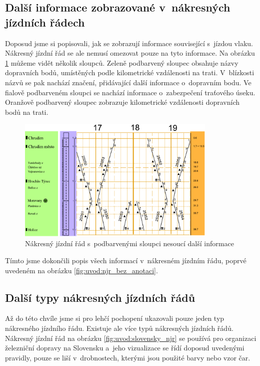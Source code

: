 \newpage
\subsection*{Další informace zobrazované v~nákresných jízdních řádech}
\label{kap1:dalsi_info}
Doposud jsme si popisovali, jak se zobrazují informace související s~jízdou vlaku. Nákresný jízdní řád se ale nemusí omezovat pouze na tyto informace. Na obrázku \ref{fig:uvod:njr_doplnky} můžeme vidět několik sloupců. Zeleně podbarvený sloupec obsahuje názvy dopravních bodů, umístěných podle kilometrické vzdálenosti na trati. V~blízkosti názvů se pak nachází značení, přidávající další informace o~dopravním bodu. Ve fialově podbarveném sloupci se nachází informace o~zabezpečení traťového úseku. Oranžově podbarvený sloupec zobrazuje kilometrické vzdálenosti dopravních bodů na trati.

\begin{figure}[ht]
	\centering
	\includegraphics[width=0.85\textwidth]{../img/kap1_uvod_grafikon_doplnky}
	\caption{Nákresný jízdní řád s~podbarvenými sloupci nesoucí další informace}
	\label{fig:uvod:njr_doplnky}
\end{figure}

Tímto jsme dokončili popis všech informací v~nákresném jízdním řádu, poprvé uvedeném na obrázku \ref{fig:uvod:njr_bez_anotaci}.

\subsection*{Další typy nákresných jízdních řádů}
Až do této chvíle jsme si pro lehčí pochopení ukazovali pouze jeden typ nákresného jízdního řádu. Existuje ale více typů nákresných jízdních řádů. Nákresný jízdní řád na obrázku \ref{fig:uvod:slovensky_njr} se používá pro organizaci železniční dopravy na Slovensku a~jeho vizualizace se řídí doposud uvedenými pravidly, pouze se liší v~drobnostech, kterými jsou použité barvy nebo vzor čar.

